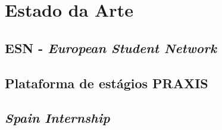 \chapter{Estado da Arte}
\label{chap:estadodaarte}

\section{ESN - \textit{European Student Network}}

\section{Plataforma de estágios PRAXIS}

\section{\textit{Spain Internship}}